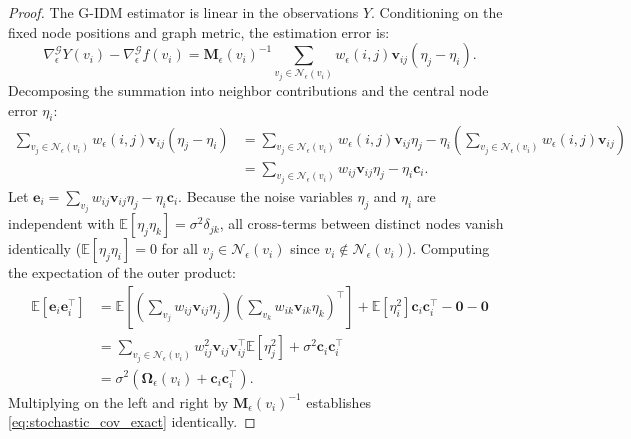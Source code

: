 \documentclass[11pt,a4paper]{article}
\theoremstyle{definition}
\begin{document}
\begin{proof}
The G-IDM estimator is linear in the observations $Y$. Conditioning on the fixed node positions and graph metric, the estimation error is:
\begin{equation}
\nabla_\epsilon^{\mathcal{G}} Y(v_i) - \nabla_\epsilon^{\mathcal{G}} f(v_i) = \mathbf{M}_\epsilon(v_i)^{-1} \sum_{v_j \in \mathcal{N}_\epsilon(v_i)} w_\epsilon(i, j) \mathbf{v}_{ij} (\eta_j - \eta_i).
\end{equation}
Decomposing the summation into neighbor contributions and the central node error $\eta_i$:
\begin{align}
\sum_{v_j \in \mathcal{N}_\epsilon(v_i)} w_\epsilon(i, j) \mathbf{v}_{ij} (\eta_j - \eta_i) &= \sum_{v_j \in \mathcal{N}_\epsilon(v_i)} w_\epsilon(i, j) \mathbf{v}_{ij} \eta_j - \eta_i \left( \sum_{v_j \in \mathcal{N}_\epsilon(v_i)} w_\epsilon(i, j) \mathbf{v}_{ij} \right) \nonumber \\
&= \sum_{v_j \in \mathcal{N}_\epsilon(v_i)} w_{ij} \mathbf{v}_{ij} \eta_j - \eta_i \mathbf{c}_i.
\end{align}
Let $\mathbf{e}_i = \sum_{v_j} w_{ij} \mathbf{v}_{ij} \eta_j - \eta_i \mathbf{c}_i$. Because the noise variables $\eta_j$ and $\eta_i$ are independent with $\mathbb{E}[\eta_j \eta_k] = \sigma^2 \delta_{jk}$, all cross-terms between distinct nodes vanish identically ($\mathbb{E}[\eta_j \eta_i] = 0$ for all $v_j \in \mathcal{N}_\epsilon(v_i)$ since $v_i \notin \mathcal{N}_\epsilon(v_i)$). 
Computing the expectation of the outer product:
\begin{align}
\mathbb{E}\left[ \mathbf{e}_i \mathbf{e}_i^\top \right] &= \mathbb{E}\left[ \left( \sum_{v_j} w_{ij} \mathbf{v}_{ij} \eta_j \right) \left( \sum_{v_k} w_{ik} \mathbf{v}_{ik} \eta_k \right)^\top \right] + \mathbb{E}\left[ \eta_i^2 \right] \mathbf{c}_i \mathbf{c}_i^\top - \mathbf{0} - \mathbf{0} \nonumber \\
&= \sum_{v_j \in \mathcal{N}_\epsilon(v_i)} w_{ij}^2 \mathbf{v}_{ij} \mathbf{v}_{ij}^\top \mathbb{E}[\eta_j^2] + \sigma^2 \mathbf{c}_i \mathbf{c}_i^\top \nonumber \\
&= \sigma^2 \left( \mathbf{\Omega}_\epsilon(v_i) + \mathbf{c}_i \mathbf{c}_i^\top \right).
\end{align}
Multiplying on the left and right by $\mathbf{M}_\epsilon(v_i)^{-1}$ establishes \eqref{eq:stochastic_cov_exact} identically.
\end{proof}
\end{document}
